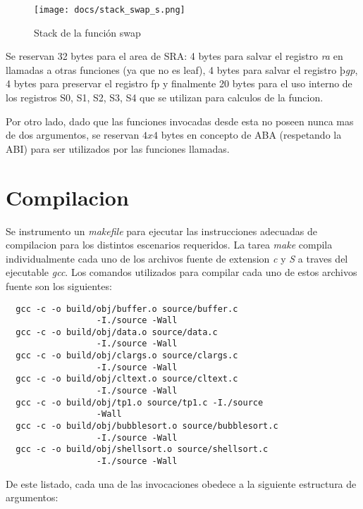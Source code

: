 \documentclass[a4paper,11pt]{article}
\begin{document}
\begin{figure}[h!]
  \centering
  \texttt{[image: docs/stack\_swap\_s.png]}
  \caption{Stack de la función swap}
\end{figure}

\FloatBarrier

  Se reservan 32 bytes para el area de SRA: 4 bytes para salvar el registro \textit{ra}
  en llamadas a otras funciones (ya que no es leaf), 4 bytes para salvar el
  registro þ\textit{gp}, 4 bytes para preservar el registro fp y finalmente 20
  bytes para el uso interno de los registros S0, S1, S2, S3, S4 que se utilizan
  para calculos de la funcion.

  Por otro lado, dado que las funciones invocadas desde esta no poseen nunca mas
  de dos argumentos, se reservan \(4 x 4\) bytes en concepto de ABA (respetando
  la ABI) para ser utilizados por las funciones llamadas.

\FloatBarrier

\section{Compilacion}

  Se instrumento un \textit{makefile} para ejecutar las instrucciones adecuadas
  de compilacion para los distintos escenarios requeridos. La
  tarea \textit{make} compila individualmente cada uno de los archivos fuente de
  extension \textit{c} y \textit{S} a traves del ejecutable \textit{gcc}.
  Los comandos utilizados para compilar cada uno de estos archivos fuente son los
  siguientes:

\begin{lstlisting}
  gcc -c -o build/obj/buffer.o source/buffer.c 
                  -I./source -Wall
  gcc -c -o build/obj/data.o source/data.c 
                  -I./source -Wall
  gcc -c -o build/obj/clargs.o source/clargs.c 
                  -I./source -Wall
  gcc -c -o build/obj/cltext.o source/cltext.c 
                  -I./source -Wall
  gcc -c -o build/obj/tp1.o source/tp1.c -I./source 
                  -Wall
  gcc -c -o build/obj/bubblesort.o source/bubblesort.c 
                  -I./source -Wall
  gcc -c -o build/obj/shellsort.o source/shellsort.c 
                  -I./source -Wall
\end{lstlisting}

  De este listado, cada una de las invocaciones obedece a la siguiente estructura
  de argumentos:
\end{document}
